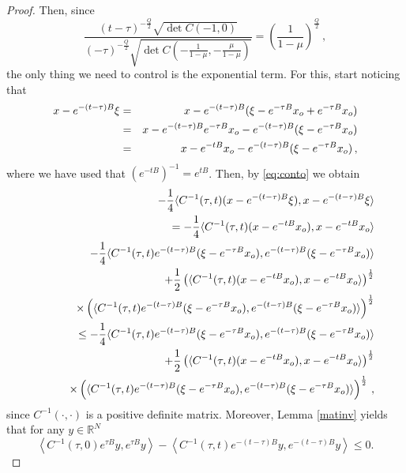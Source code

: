\documentclass{amsart}
\numberwithin{equation}{section}
\def \r{{\mathbb{R}}}
\begin{document}
{{\begin{proof}
Then, since 
\[
\frac{(t-\tau)^{-\frac{Q}{2}}\sqrt{\det C(-1,0)}}{(-\tau)^{-\frac{Q}{2}}\sqrt{\det C(-\frac{1}{1-\mu},-\frac{\mu}{1-\mu})}} = \left(\frac{1}{1-\mu}\right)^{\frac{Q}{2}}\,,
\] 
the only thing we need to control is the exponential term. For this, start noticing that
\begin{eqnarray}\label{eq:conto}
    x-e^{-(t-\tau)B}\xi & = & x - e^{-(t-\tau)B}(\xi -e^{-\tau B}x_{\rm o}+ e^{-\tau B}x_{\rm o})\notag\\
    & = & x - e^{-(t-\tau)B}e^{-\tau B}x_{\rm o} - e^{-(t-\tau)B}(\xi -e^{-\tau B}x_{\rm o})\notag\\
    & = &  x - e^{-tB}x_{\rm o}- e^{-(t-\tau)B}(\xi -e^{-\tau B}x_{\rm o})\,,
\end{eqnarray}
where we have used that $(e^{-tB})^{-1}=e^{t B}$. Then, by  \eqref{eq:conto} we obtain
\begin{eqnarray}\label{exponent}
&&-\frac{1}{4}\langle C^{-1}(\tau,t)(x-e^{-(t-\tau)B}\xi),x-e^{-(t-\tau)B}\xi\rangle\notag\\
&& \quad = -\frac{1}{4}\langle C^{-1}(\tau,t)(x-e^{-tB}x_{\rm o}),x-e^{-tB}x_{\rm o}\rangle\notag\\
&& \qquad -\frac{1}{4}\langle C^{-1}(\tau,t)e^{-(t-\tau)B}(\xi -e^{-\tau B}x_{\rm o}),e^{-(t-\tau)B}(\xi -e^{-\tau B}x_{\rm o})\rangle\nonumber\\
&& \qquad + \frac{1}{2}\left(\langle C^{-1}(\tau,t)(x-e^{-tB}x_{\rm o}),x-e^{-tB}x_{\rm o}\rangle\right)^\frac{1}{2}\notag\\
&& \qquad \times \left( \langle C^{-1}(\tau,t)e^{-(t-\tau)B}(\xi -e^{-\tau B}x_{\rm o}),e^{-(t-\tau)B}(\xi -e^{-\tau B}x_{\rm o})\rangle\right)^\frac{1}{2}\notag\\ 
&& \quad \leq -\frac{1}{4}\langle C^{-1}(\tau,t)e^{-(t-\tau)B}(\xi -e^{-\tau B}x_{\rm o}),e^{-(t-\tau)B}(\xi -e^{-\tau B}x_{\rm o})\rangle\\
&& \qquad + \frac{1}{2}\left(\langle C^{-1}(\tau,t)(x-e^{-tB}x_{\rm o}),x-e^{-tB}x_{\rm o}\rangle\right)^\frac{1}{2}\notag\\
&& \qquad \times \left( \langle C^{-1}(\tau,t)e^{-(t-\tau)B}(\xi -e^{-\tau B}x_{\rm o}),e^{-(t-\tau)B}(\xi -e^{-\tau B}x_{\rm o})\rangle\right)^\frac{1}{2} \,, \notag
\end{eqnarray}
since $C^{-1}(\cdot,\cdot)$ is a positive definite matrix.  Moreover, Lemma \ref{matinv} yields that for any $y \in \r^N$
 $$
 \left\langle C^{-1}(\tau,0)e^{\tau B}y,e^{\tau B}y\right\rangle-\left\langle C^{-1}(\tau,t) e^{-(t-\tau)B}y,e^{-(t-\tau)B}y\right\rangle\leq 0.
$$
\end{proof}}}
\end{document}
